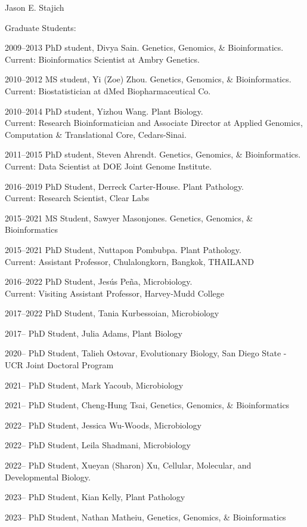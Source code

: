 \documentclass[10pt]{article}
\begin{document}
\begin{cv}{\centerline{Jason E. Stajich}}
\begin{cvlistcompact}{Graduate Students:}
\item [2009--2013] PhD student, Divya Sain. Genetics, Genomics, \&
  Bioinformatics. \\ Current: Bioinformatics Scientist at Ambry Genetics.
\item [2010--2012] MS student, Yi (Zoe) Zhou. Genetics, Genomics, \&
  Bioinformatics. \\ Current: Biostatistician at dMed Biopharmaceutical Co.
\item [2010--2014] PhD student, Yizhou Wang. Plant Biology. \\ Current:
  Research Bioinformatician and Associate Director at Applied Genomics, Computation \& Translational Core, Cedars-Sinai.
\item [2011--2015] PhD student, Steven Ahrendt. Genetics, Genomics, \&
  Bioinformatics. \\ Current: Data Scientist at DOE Joint Genome Institute.
\item [2016--2019] PhD Student, Derreck Carter-House. Plant Pathology. \\ Current: Research Scientist, Clear Labs
\item [2015--2021] MS Student, Sawyer Masonjones. Genetics, Genomics, \&
  Bioinformatics
\item [2015--2021] PhD Student, Nuttapon Pombubpa. Plant Pathology. \\ Current: Assistant Professor, Chulalongkorn, Bangkok, THAILAND
\item [2016--2022] PhD Student, Jes\'{u}s Pe\~{n}a, Microbiology. \\ Current: Visiting Assistant Professor, Harvey-Mudd College
\item [2017--2022] PhD Student, Tania Kurbessoian, Microbiology
\item [2017--] PhD Student, Julia Adams, Plant Biology
\item [2020--] PhD Student, Talieh Ostovar, Evolutionary Biology, San Diego State - UCR Joint Doctoral Program
\item [2021--] PhD Student, Mark Yacoub, Microbiology
\item [2021--] PhD Student, Cheng-Hung Tsai, Genetics, Genomics, \& Bioinformatics
\item [2022--] PhD Student, Jessica Wu-Woods, Microbiology
\item [2022--] PhD Student, Leila Shadmani, Microbiology
\item [2022--] PhD Student, Xueyan (Sharon) Xu, Cellular, Molecular, and Developmental Biology.
\item [2023--] PhD Student, Kian Kelly, Plant Pathology
\item [2023--] PhD Student, Nathan Matheiu, Genetics, Genomics, \& Bioinformatics
\end{cvlistcompact}


\end{cv}
\end{document}
